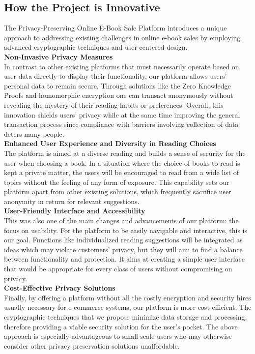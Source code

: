 \documentclass[12pt]{article}
\begin{document}
\subsection{How the Project is Innovative}

The Privacy-Preserving Online E-Book Sale Platform introduces a unique approach to addressing existing challenges in online e-book sales by employing advanced cryptographic techniques and user-centered design.\\

\textbf{Non-Invasive Privacy Measures}\\
In contrast to other existing platforms that must necessarily operate based on user data directly to display their functionality, our platform allows users’ personal data to remain secure. Through solutions like the Zero Knowledge Proofs and homomorphic encryption one can transact anonymously without revealing the mystery of their reading habits or preferences. Overall, this innovation shields users’ privacy while at the same time improving the general transaction process since compliance with barriers involving collection of data deters many people.\\

\textbf{Enhanced User Experience and Diversity in Reading Choices}\\
The platform is aimed at a diverse reading and builds a sense of security for the user when choosing a book. In a situation where the choice of books to read is kept a private matter, the users will be encouraged to read from a wide list of topics without the feeling of any form of exposure. This capability sets our platform apart from other existing solutions, which frequently sacrifice user anonymity in return for relevant suggestions.\\

\textbf{User-Friendly Interface and Accessibility}\\
This was also one of the main changes and advancements of our platform: the focus on usability. For the platform to be easily navigable and interactive, this is our goal. Functions like individualized reading suggestions will be integrated as ideas which may violate customers’ privacy, but they will aim to find a balance between functionality and protection. It aims at creating a simple user interface that would be appropriate for every class of users without compromising on privacy.\\

\textbf{Cost-Effective Privacy Solutions}\\
Finally, by offering a platform without all the costly encryption and security hires usually necessary for e-commerce systems, our platform is more cost efficient. The cryptographic techniques that we propose minimize data storage and processing, therefore providing a viable security solution for the user’s pocket. The above approach is especially advantageous to small-scale users who may otherwise consider other privacy preservation solutions unaffordable.
\end{document}
